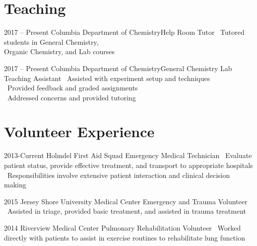 \documentclass{bscv}
\begin{document}
\section{Teaching}
\begin{eventlist}
\item{2017 -- Present}
  {Columbia Department of Chemistry}{Help Room Tutor}
  \textbullet\  Tutored students in General Chemistry, \\  Organic Chemistry, and Lab courses

\item{2017 -- Present}
  {Columbia Department of Chemistry}{General Chemistry Lab Teaching Assistant}
  \textbullet\ Assisted with experiment setup and techniques \\
  \textbullet\ Provided feedback and graded assignments \\
  \textbullet\ Addressed concerns and provided tutoring
 
\end{eventlist}

\section{Volunteer Experience}

\begin{eventlist}
\item{2013-Current}
  {Holmdel First Aid Squad}
  {Emergency Medical Technician}
  {\textbullet\ Evaluate patient status, provide effective treatment, and transport to appropriate hospitals \newline \textbullet\ Responsibilities involve extensive patient interaction and clinical decision making}

\item{2015}
  {Jersey Shore University Medical Center}
  {Emergency and Trauma Volunteer}
  {\textbullet\ Assisted in triage, provided basic treatment, and assisted in trauma treatment}

\item{2014}
  {Riverview Medical Center}
  {Pulmonary Rehabilitation Volunteer}
  {\textbullet\ Worked directly with patients to assist in exercise routines to rehabilitate lung function}
  
\end{eventlist}

\end{document}
